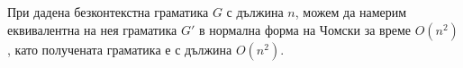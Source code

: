 \begin{thm}
  При дадена безконтекстна граматика $G$ с дължина $n$, можем да намерим еквивалентна
  на нея граматика $G'$ в нормална форма на Чомски за време $O(n^2)$,
  като получената граматика е с дължина $O(n^2)$.
\end{thm}




